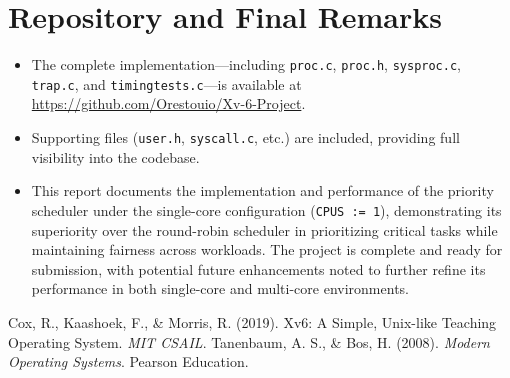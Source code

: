 \documentclass{article}
\begin{document}
\section{Repository and Final Remarks}
\begin{itemize}
    \item The complete implementation—including \texttt{proc.c}, \texttt{proc.h}, \texttt{sysproc.c}, \texttt{trap.c}, and \texttt{timingtests.c}—is available at \url{https://github.com/Orestouio/Xv-6-Project}.
    \item Supporting files (\texttt{user.h}, \texttt{syscall.c}, etc.) are included, providing full visibility into the codebase.
    \item This report documents the implementation and performance of the priority scheduler under the single-core configuration (\texttt{CPUS := 1}), demonstrating its superiority over the round-robin scheduler in prioritizing critical tasks while maintaining fairness across workloads. The project is complete and ready for submission, with potential future enhancements noted to further refine its performance in both single-core and multi-core environments.
\end{itemize}

\begin{thebibliography}{9}
Cox, R., Kaashoek, F., \& Morris, R. (2019). Xv6: A Simple, Unix-like Teaching Operating System. \textit{MIT CSAIL}.
Tanenbaum, A. S., \& Bos, H. (2008). \textit{Modern Operating Systems}. Pearson Education.
\end{thebibliography}
\end{document}
